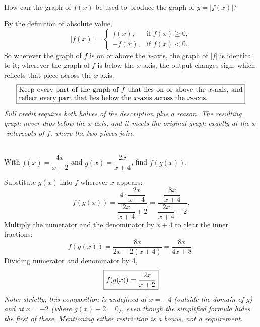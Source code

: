 \documentclass[11pt]{article}
\begin{document}
\begin{questions}[resume]
\item {}\\
  How can the graph of $f(x)$ be used to produce the graph of $y = |f(x)|$?
  \begin{solution}
    By the definition of absolute value,
    \[
      |f(x)| =
      \begin{cases}
        f(x), & \text{if } f(x) \ge 0,\\
        -f(x), & \text{if } f(x) < 0.
      \end{cases}
    \]
    So wherever the graph of $f$ is on or above the $x$-axis, the graph of $|f|$ is
    identical to it; wherever the graph of $f$ is below the $x$-axis, the output changes
    sign, which reflects that piece across the $x$-axis.
    \[ \answertext{Keep every part of the graph of $f$ that lies on or above the
      $x$-axis, and reflect every part that lies below the $x$-axis across the $x$-axis.} \]
    \textit{Full credit requires both halves of the description plus a reason. The
    resulting graph never dips below the $x$-axis, and it meets the original graph exactly
    at the $x$-intercepts of $f$, where the two pieces join.}
  \end{solution}

\item {}\\
  With $f(x) = \dfrac{4x}{x+2}$ and $g(x) = \dfrac{2x}{x+4}$, find $f(g(x))$.
  \begin{solution}
    Substitute $g(x)$ into $f$ wherever $x$ appears:
    \[
      f(g(x)) = \frac{4 \cdot \dfrac{2x}{x+4}}{\dfrac{2x}{x+4} + 2}
              = \frac{\dfrac{8x}{x+4}}{\dfrac{2x}{x+4} + 2}.
    \]
    Multiply the numerator and the denominator by $x + 4$ to clear the inner fractions:
    \[
      f(g(x)) = \frac{8x}{2x + 2(x+4)} = \frac{8x}{4x + 8}.
    \]
    Dividing numerator and denominator by 4,
    \[ \fbox{$\displaystyle f(g(x)) = \frac{2x}{x+2}$} \]
    \textit{Note: strictly, this composition is undefined at $x = -4$ (outside the domain
    of $g$) and at $x = -2$ (where $g(x) + 2 = 0$), even though the simplified formula
    hides the first of these. Mentioning either restriction is a bonus, not a requirement.}
  \end{solution}


\end{questions}
\end{document}
